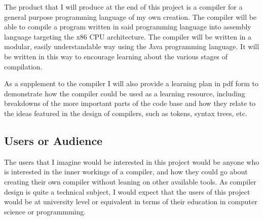 \documentclass[a4paper,12pt]{article}
\begin{document}
The product that I will produce at the end of this project is a compiler for a general purpose programming language of my own creation. The compiler will be able to compile a program written in said programming language into assembly language targeting the x86 CPU architecture. The compiler will be written in a modular, easily understandable way using the Java programming language. It will be written in this way to encourage learning about the various stages of compilation. 

As a supplement to the compiler I will also provide a learning plan in pdf form to demonstrate how the compiler could be used as a learning resource, including breakdowns of the more important parts of the code base and how they relate to the ideas featured in the design of compilers, such as tokens, syntax trees, etc.

\subsection{Users or Audience}
\label{sec:orge33f8ce}

The users that I imagine would be interested in this project would be anyone who is interested in the inner workings of a compiler, and how they could go about creating their own compiler without leaning on other available tools. As compiler design is quite a technical subject, I would expect that the users of this project would be at university level or equivalent in terms of their education in computer science or programmming.
\end{document}
